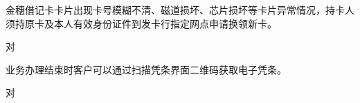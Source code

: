 \documentclass[kindlepaper]{BHCexam4kindle}
\begin{document}
\begin{questions}
\qs 金穗借记卡卡片出现卡号模糊不清、磁道损坏、芯片损坏等卡片异常情况，持卡人须持原卡及本人有效身份证件到发卡行指定网点申请换领新卡。 \xx
\begin{solution} 对 \end{solution}
\qs 业务办理结束时客户可以通过扫描凭条界面二维码获取电子凭条。 \xx
\begin{solution} 对 \end{solution}
	\end{questions}
\end{document}
